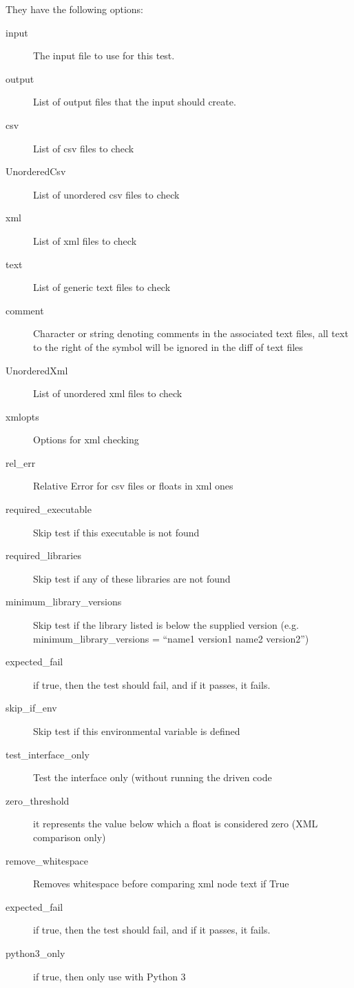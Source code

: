 \documentclass{article}
\begin{document}
They have the following options:

\begin{description}
    \item[input] The input file to use for this test.
    \item[output] List of output files that the input should create.
    \item[csv] List of csv files to check
    \item[UnorderedCsv] List of unordered csv files to check
    \item[xml] List of xml files to check
    \item[text] List of generic text files to check
    \item[comment] Character or string denoting comments in the associated text files, all text to the right of the symbol will be ignored in the diff of text files
    \item[UnorderedXml] List of unordered xml files to check
    \item[xmlopts] Options for xml checking
    \item[rel\_err] Relative Error for csv files or floats in xml ones
    \item[required\_executable] Skip test if this executable is not found
    \item[required\_libraries] Skip test if any of these libraries are not found
    \item[minimum\_library\_versions] Skip test if the library listed is below the supplied version (e.g. minimum\_library\_versions = ``name1 version1 name2 version2'')
    \item[expected\_fail] if true, then the test should fail, and if it passes, it fails.
    \item[skip\_if\_env] Skip test if this environmental variable is defined
    \item[test\_interface\_only] Test the interface only (without running the driven code
    \item[zero\_threshold] it represents the value below which a float is considered zero (XML comparison only)
    \item[remove\_whitespace] Removes whitespace before comparing xml node text if True
    \item[expected\_fail] if true, then the test should fail, and if it passes, it fails.
    \item[python3\_only] if true, then only use with Python 3
\end{description}
\end{document}
